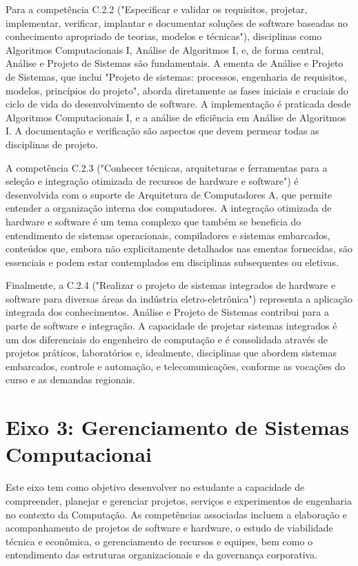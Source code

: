 Para a competência C.2.2 ("Especificar e validar os requisitos, projetar, implementar, verificar, implantar e documentar soluções de software baseadas no conhecimento apropriado de teorias, modelos e técnicas"), disciplinas como Algoritmos Computacionais I, Análise de Algoritmos I, e, de forma central, Análise e Projeto de Sistemas são fundamentais. A ementa de Análise e Projeto de Sistemas, que inclui "Projeto de sistemas: processos, engenharia de requisitos, modelos, princípios do projeto", aborda diretamente as fases iniciais e cruciais do ciclo de vida do desenvolvimento de software. A implementação é praticada desde Algoritmos Computacionais I, e a análise de eficiência em Análise de Algoritmos I. A documentação e verificação são aspectos que devem permear todas as disciplinas de projeto.

A competência C.2.3 ("Conhecer técnicas, arquiteturas e ferramentas para a seleção e integração otimizada de recursos de hardware e software") é desenvolvida com o suporte de Arquitetura de Computadores A, que permite entender a organização interna dos computadores. A integração otimizada de hardware e software é um tema complexo que também se beneficia do entendimento de sistemas operacionais, compiladores e sistemas embarcados, conteúdos que, embora não explicitamente detalhados nas ementas fornecidas, são essenciais e podem estar contemplados em disciplinas subsequentes ou eletivas.

Finalmente, a C.2.4 ("Realizar o projeto de sistemas integrados de hardware e software para diversas áreas da indústria eletro-eletrônica") representa a aplicação integrada dos conhecimentos. Análise e Projeto de Sistemas contribui para a parte de software e integração. A capacidade de projetar sistemas integrados é um dos diferenciais do engenheiro de computação e é consolidada através de projetos práticos, laboratórios e, idealmente, disciplinas que abordem sistemas embarcados, controle e automação, e telecomunicações, conforme as vocações do curso e as demandas regionais.


\section*{Eixo 3: Gerenciamento de Sistemas Computacionai}

Este eixo tem como objetivo desenvolver no estudante a capacidade de compreender, planejar e gerenciar projetos, serviços e experimentos de engenharia no contexto da Computação. As competências associadas incluem a elaboração e acompanhamento de projetos de software e hardware, o estudo de viabilidade técnica e econômica, o gerenciamento de recursos e equipes, bem como o entendimento das estruturas organizacionais e da governança corporativa.

